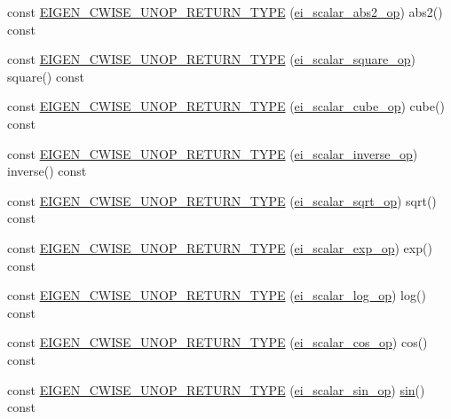 \begin{DoxyCompactItemize}
\item 
const \hyperlink{class_cwise_af1f1a4fbc98734683b2526674963cb70}{E\-I\-G\-E\-N\-\_\-\-C\-W\-I\-S\-E\-\_\-\-U\-N\-O\-P\-\_\-\-R\-E\-T\-U\-R\-N\-\_\-\-T\-Y\-P\-E} (\hyperlink{structei__scalar__abs2__op}{ei\-\_\-scalar\-\_\-abs2\-\_\-op}) abs2() const 
\item 
const \hyperlink{class_cwise_a26d4044a63c08d8eaf6f399b5af45c21}{E\-I\-G\-E\-N\-\_\-\-C\-W\-I\-S\-E\-\_\-\-U\-N\-O\-P\-\_\-\-R\-E\-T\-U\-R\-N\-\_\-\-T\-Y\-P\-E} (\hyperlink{structei__scalar__square__op}{ei\-\_\-scalar\-\_\-square\-\_\-op}) square() const 
\item 
const \hyperlink{class_cwise_ac0c169ddcf4d87f2384fa9b006736689}{E\-I\-G\-E\-N\-\_\-\-C\-W\-I\-S\-E\-\_\-\-U\-N\-O\-P\-\_\-\-R\-E\-T\-U\-R\-N\-\_\-\-T\-Y\-P\-E} (\hyperlink{structei__scalar__cube__op}{ei\-\_\-scalar\-\_\-cube\-\_\-op}) cube() const 
\item 
const \hyperlink{class_cwise_a039baf8126bc59f582cab575a6ba7658}{E\-I\-G\-E\-N\-\_\-\-C\-W\-I\-S\-E\-\_\-\-U\-N\-O\-P\-\_\-\-R\-E\-T\-U\-R\-N\-\_\-\-T\-Y\-P\-E} (\hyperlink{structei__scalar__inverse__op}{ei\-\_\-scalar\-\_\-inverse\-\_\-op}) inverse() const 
\item 
const \hyperlink{class_cwise_adf4fbd54185bbbfc322cfdf6e73a01ea}{E\-I\-G\-E\-N\-\_\-\-C\-W\-I\-S\-E\-\_\-\-U\-N\-O\-P\-\_\-\-R\-E\-T\-U\-R\-N\-\_\-\-T\-Y\-P\-E} (\hyperlink{structei__scalar__sqrt__op}{ei\-\_\-scalar\-\_\-sqrt\-\_\-op}) sqrt() const 
\item 
const \hyperlink{class_cwise_a4617e92c480084cb453a51940c0d3eeb}{E\-I\-G\-E\-N\-\_\-\-C\-W\-I\-S\-E\-\_\-\-U\-N\-O\-P\-\_\-\-R\-E\-T\-U\-R\-N\-\_\-\-T\-Y\-P\-E} (\hyperlink{structei__scalar__exp__op}{ei\-\_\-scalar\-\_\-exp\-\_\-op}) exp() const 
\item 
const \hyperlink{class_cwise_a2708eb9bfe2eb9d277e0c0e7c16fe3f4}{E\-I\-G\-E\-N\-\_\-\-C\-W\-I\-S\-E\-\_\-\-U\-N\-O\-P\-\_\-\-R\-E\-T\-U\-R\-N\-\_\-\-T\-Y\-P\-E} (\hyperlink{structei__scalar__log__op}{ei\-\_\-scalar\-\_\-log\-\_\-op}) log() const 
\item 
const \hyperlink{class_cwise_a011773670e328f38f7a41c200e4886ab}{E\-I\-G\-E\-N\-\_\-\-C\-W\-I\-S\-E\-\_\-\-U\-N\-O\-P\-\_\-\-R\-E\-T\-U\-R\-N\-\_\-\-T\-Y\-P\-E} (\hyperlink{structei__scalar__cos__op}{ei\-\_\-scalar\-\_\-cos\-\_\-op}) cos() const 
\item 
const \hyperlink{class_cwise_a95665ed6b122774bbf970a970cbd1f18}{E\-I\-G\-E\-N\-\_\-\-C\-W\-I\-S\-E\-\_\-\-U\-N\-O\-P\-\_\-\-R\-E\-T\-U\-R\-N\-\_\-\-T\-Y\-P\-E} (\hyperlink{structei__scalar__sin__op}{ei\-\_\-scalar\-\_\-sin\-\_\-op}) \hyperlink{_parse_e_k_f_log_8m_a8ed746a5120b500de3370e247280cab7}{sin}() const 

\end{DoxyCompactItemize}

